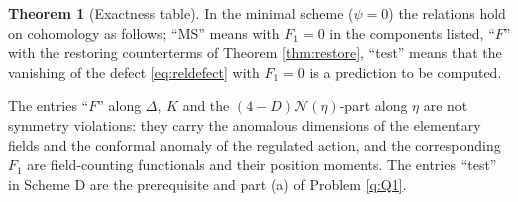 \documentclass[11pt]{article}
\theoremstyle{definition}
\newtheorem{theorem}[definition]{Theorem}
\numberwithin{equation}{section}
\begin{document}
\begin{theorem}[Exactness table]
\label{thm:table}
In the minimal scheme ($\psi=0$) the relations hold on cohomology as follows; ``MS'' means with $F_1=0$ in the components listed, ``$F$'' with the restoring counterterms of Theorem \ref{thm:restore}, ``test'' means that the vanishing of the defect \eqref{eq:reldefect} with $F_1=0$ is a prediction to be computed.

\mbox{}\par\smallskip{}\par\smallskip

The entries ``$F$'' along $\Delta$, $K$ and the $(4-D)\mathcal N(\eta)$-part along $\eta$ are not symmetry violations: they carry the anomalous dimensions of the elementary fields and the conformal anomaly of the regulated action, and the corresponding $F_1$ are field-counting functionals and their position moments. The entries ``test'' in Scheme D are the prerequisite and part (a) of Problem \ref{q:Q1}.
\end{theorem}
\end{document}
